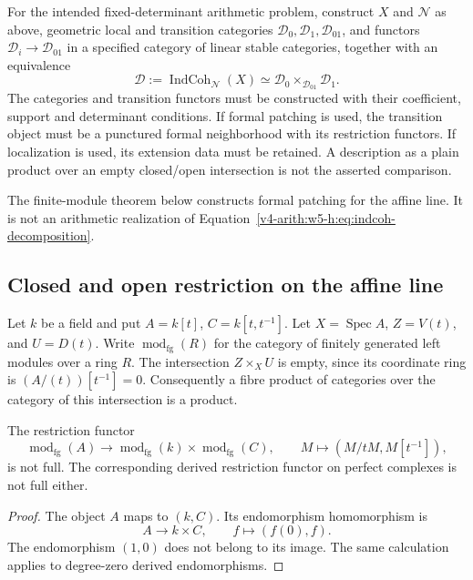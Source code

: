\begin{conjecture}
\label{v4-arith:w5-h:prop:det-cleavage-identifies-indcoh}
For the intended fixed-determinant arithmetic problem, construct $X$
and $\mathcal N$ as above, geometric local and transition categories
$\mathcal D_0,\mathcal D_1,\mathcal D_{01}$, and functors
$\mathcal D_i\to\mathcal D_{01}$ in a specified category of linear
stable categories, together with an equivalence
\begin{equation}
\label{v4-arith:w5-h:eq:indcoh-decomposition}
 \mathcal D:=\operatorname{IndCoh}_{\mathcal N}(X)
 \simeq\mathcal D_0\times_{\mathcal D_{01}}\mathcal D_1.
\end{equation}
The categories and transition functors must be constructed with their
coefficient, support and determinant conditions. If formal patching is
used, the transition object must be a punctured formal neighborhood
with its restriction functors. If localization is used, its extension
data must be retained. A description as a plain product over an empty
closed/open intersection is not the asserted comparison.
\end{conjecture}

The finite-module theorem below constructs formal patching for the
affine line. It is not an arithmetic realization of
Equation~\eqref{v4-arith:w5-h:eq:indcoh-decomposition}.

\subsection{Closed and open restriction on the affine line}

Let $k$ be a field and put $A=k[t]$, $C=k[t,t^{-1}]$.
Let $X=\operatorname{Spec}A$, $Z=V(t)$, and $U=D(t)$.
Write $\operatorname{mod}_{\mathrm{fg}}(R)$ for the category of
finitely generated left modules over a ring $R$.
The intersection $Z\times_X U$ is empty, since its coordinate ring
is $(A/(t))[t^{-1}]=0$.
Consequently a fibre product of categories over the category of this
intersection is a product.

\begin{proposition}
\label{v4-arith:w5-h:closed-open-failure}
The restriction functor
\[
 \operatorname{mod}_{\mathrm{fg}}(A)\longrightarrow
 \operatorname{mod}_{\mathrm{fg}}(k)\times
 \operatorname{mod}_{\mathrm{fg}}(C),\qquad
 M\longmapsto(M/tM,M[t^{-1}]),
\]
is not full. The corresponding derived restriction functor on
perfect complexes is not full either.
\end{proposition}
\begin{proof}
The object $A$ maps to $(k,C)$. Its endomorphism homomorphism is
\[
 A\longrightarrow k\times C,\qquad f\longmapsto(f(0),f).
\]
The endomorphism $(1,0)$ does not belong to its image.
The same calculation applies to degree-zero derived endomorphisms.
\end{proof}

